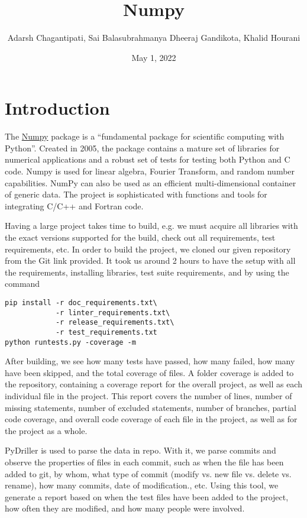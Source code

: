 \documentclass{article}
\title{Numpy}
\author{Adarsh Chagantipati, Sai Balasubrahmanya Dheeraj Gandikota, Khalid Hourani}
\date{May 1, 2022}
\begin{document}
\maketitle
\tableofcontents
\section{Introduction}
The \href{https://github.com/numpy/numpy/}{Numpy} package is a ``fundamental package for scientific computing with Python''\cite{2020NumPy-Array}. Created in 2005, the
package contains a mature set of libraries for numerical applications and a robust set of tests for testing both Python and C code. Numpy is used
for linear algebra, Fourier Transform, and random number capabilities. NumPy can also be used as an efficient multi-dimensional container of generic data. The project is sophisticated with functions and tools for integrating C/C++ and Fortran code.

Having a large project takes time to build, e.g. we must acquire all libraries with the exact versions supported for the build,
check out all requirements, test requirements, etc. In order to build the project, we cloned our given repository from the Git link provided.
It took us around 2 hours to have the setup with all the requirements, installing libraries, test suite requirements, and by using the command

\begin{verbatim}
pip install -r doc_requirements.txt\
            -r linter_requirements.txt\
            -r release_requirements.txt\
            -r test_requirements.txt 
python runtests.py -coverage -m
\end{verbatim}
After building, we see how many tests have passed, how many failed, how many have been skipped, and the total coverage of files. A folder coverage is added to the repository, containing a coverage report for the overall project, as well as each individual file in the project. This report covers
the number of lines, number of missing statements, number of excluded statements, number of branches, partial code coverage, and overall code coverage of each file in the project, as well as for the project as a whole. 

PyDriller is used to parse the data in repo. With it, we parse commits and observe the properties of files in each commit, such as when the file has
been added to git, by whom, what type of commit (modify vs. new file vs. delete vs. rename), how many commits, date of modification., etc. Using this tool, we generate a report based on when the test files have been added to the project, how often they are modified, and how many people were involved.
\end{document}
